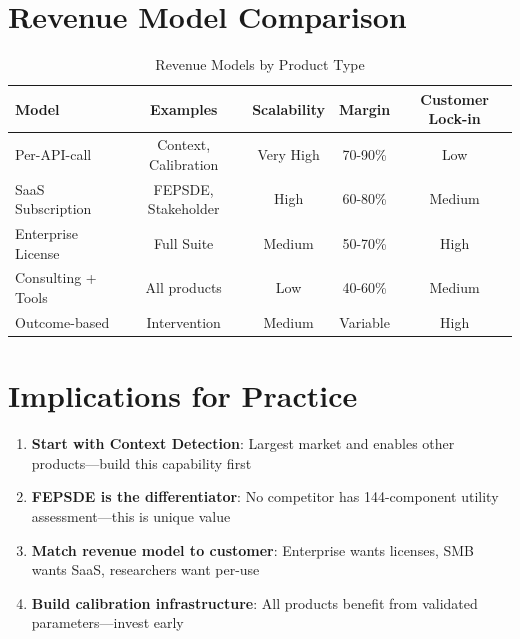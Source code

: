 \section{Revenue Model Comparison}
\label{sec:vvv3-revenue}

\begin{table}[htbp]
\centering
\caption{Revenue Models by Product Type}
\label{tab:vvv-revenue}
\renewcommand{\arraystretch}{1.3}
\begin{tabular}{@{}lcccc@{}}
\toprule
\textbf{Model} & \textbf{Examples} & \textbf{Scalability} & \textbf{Margin} & \textbf{Customer Lock-in} \\
\midrule
Per-API-call & Context, Calibration & Very High & 70-90\% & Low \\
SaaS Subscription & FEPSDE, Stakeholder & High & 60-80\% & Medium \\
Enterprise License & Full Suite & Medium & 50-70\% & High \\
Consulting + Tools & All products & Low & 40-60\% & Medium \\
Outcome-based & Intervention & Medium & Variable & High \\
\bottomrule
\end{tabular}
\end{table}


\section{Implications for Practice}
\label{sec:vvv3-practice}

\begin{tcolorbox}[colback=green!5!white, colframe=green!75!black,
    title=Practical Implications]
\begin{enumerate}
\item \textbf{Start with Context Detection}: Largest market and enables other products---build this capability first
\item \textbf{FEPSDE is the differentiator}: No competitor has 144-component utility assessment---this is unique value
\item \textbf{Match revenue model to customer}: Enterprise wants licenses, SMB wants SaaS, researchers want per-use
\item \textbf{Build calibration infrastructure}: All products benefit from validated parameters---invest early
\end{enumerate}
\end{tcolorbox}


